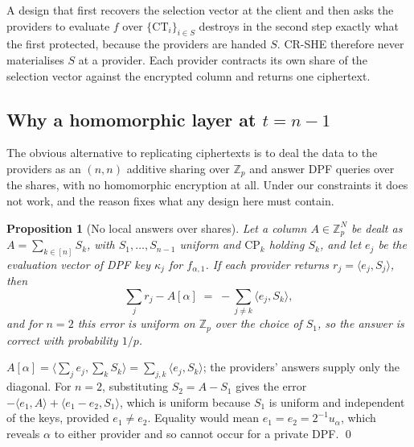 \documentclass[a4paper,fleqn]{cas-sc}
\newtheorem{proposition}{Proposition}
\begin{document}
A design that first recovers the selection vector at the client and then asks
the providers to evaluate $f$ over $\{\text{CT}_i\}_{i\in S}$ destroys in the
second step exactly what the first protected, because the providers are handed
$S$. CR-SHE therefore never materialises $S$ at a provider. Each provider
contracts its own share of the selection vector against the encrypted column
and returns one ciphertext.

\subsection{Why a homomorphic layer at $t=n-1$}
\label{sec:whyrep}
The obvious alternative to replicating ciphertexts is to deal the data to the
providers as an $(n,n)$ additive sharing over $\mathbb{Z}_p$ and answer DPF
queries over the shares, with no homomorphic encryption at all. Under our
constraints it does not work, and the reason fixes what any design here must
contain.

\begin{proposition}[No local answers over shares]
\label{prop:nolocal}
Let a column $A\in\mathbb{Z}_p^N$ be dealt as $A=\sum_{k\in[n]}S_k$, with
$S_1,\dots,S_{n-1}$ uniform and $\text{CP}_k$ holding $S_k$, and let $e_j$ be
the evaluation vector of DPF key $\kappa_j$ for $f_{\alpha,1}$. If each
provider returns $r_j=\langle e_j,S_j\rangle$, then
\[
\textstyle\sum_{j} r_j - A[\alpha] \;=\; -\sum_{j\neq k}\langle e_j,S_k\rangle ,
\]
and for $n=2$ this error is uniform on $\mathbb{Z}_p$ over the choice of
$S_1$, so the answer is correct with probability $1/p$.
\end{proposition}
\begin{pf}
$A[\alpha]=\langle\sum_j e_j,\sum_k S_k\rangle=\sum_{j,k}\langle e_j,S_k\rangle$;
the providers' answers supply only the diagonal. For $n=2$, substituting
$S_2=A-S_1$ gives the error $-\langle e_1,A\rangle+\langle e_1-e_2,S_1\rangle$,
which is uniform because $S_1$ is uniform and independent of the keys, provided
$e_1\neq e_2$. Equality would mean $e_1=e_2=2^{-1}u_\alpha$, which reveals
$\alpha$ to either provider and so cannot occur for a private DPF. \qed
\end{pf}
\end{document}
